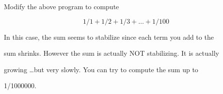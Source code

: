 Modify the above program to compute



\[1/1 + 1/2 + 1/3 + \ldots + 1/100\]



In this case, the sum seems to stabilize since each term you add to the

sum shrinks. However the sum is actually NOT stabilizing. It is actually

growing \ldots but very slowly. You can try to compute the sum up to

1/1000000.

